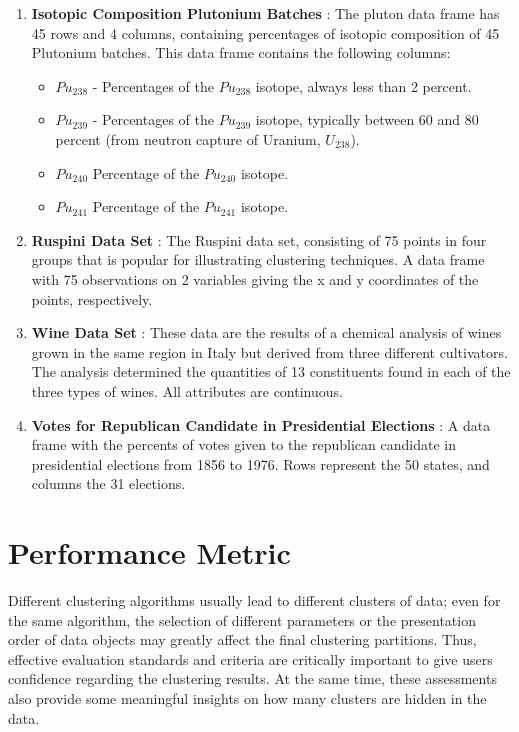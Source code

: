 \begin{enumerate}
\item \textbf{Isotopic Composition Plutonium Batches} : The pluton data frame has 45 rows and
4 columns, containing percentages of isotopic composition of 45 Plutonium batches.
This data frame contains the following columns:
\begin{itemize}
\item \textit{$Pu_{238}$} - Percentages of the \textit{$Pu_{238}$} isotope, always less than 2 percent.
\item \textit{$Pu_{239}$} - Percentages of the \textit{$Pu_{239}$} isotope, typically between 60 and 80 percent
(from neutron capture of Uranium, \textit{$U_{238}$}).
\item \textit{$Pu_{240}$} Percentage of the \textit{$Pu_{240}$} isotope.
\item \textit{$Pu_{241}$} Percentage of the \textit{$Pu_{241}$} isotope.
\end{itemize}

\item \textbf{Ruspini Data Set} : The Ruspini data set, consisting of 75 points in four groups that
is popular for illustrating clustering techniques. A data frame with 75 observations on 2 variables giving
the x and y coordinates of the points, respectively.

\item \textbf{Wine Data Set} : These data are the results of a chemical analysis of wines grown
in the same region in Italy but derived from three different cultivators. The analysis determined
the quantities of 13 constituents found in each of the three types of wines. All attributes are continuous.

\item \textbf{Votes for Republican Candidate in Presidential Elections} : A data frame with the percents
of votes given to the republican candidate in presidential elections from 1856 to 1976. Rows represent the
50 states, and columns the 31 elections.

\end{enumerate}


\section{Performance Metric}
Different clustering algorithms usually lead to different clusters of data; even for the same
algorithm, the selection of different parameters or the presentation order of data objects
may greatly affect the final clustering partitions. Thus, effective evaluation standards and
criteria are critically important to give users confidence regarding the clustering results. At
the same time, these assessments also provide some meaningful insights on how many clusters
are hidden in the data.


